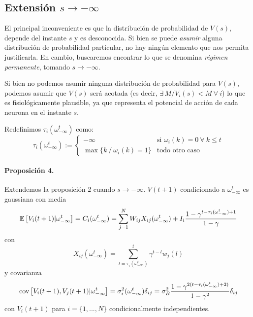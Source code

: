 \subsection{Extensión $s \rightarrow -\infty$} %

El principal inconveniente es que la distribución de probabilidad de $V(s)$, depende del instante $s$ y es desconocida. 
Si bien se puede \emph{asumir} alguna distribución de probabilidad particular, no hay ningún elemento que nos permita justificarla. En cambio, buscaremos encontrar lo que se denomina \emph{régimen permanente}, tomando $s \rightarrow - \infty$.

Si bien no podemos asumir ninguna distribución de probabilidad para $V(s)$, podemos asumir que $V(s)$ será acotada (es decir, $\exists \, M / V_i(s) < M \ \forall \ i$) lo que es fisiológicamente plausible, ya que representa el potencial de acción de cada neurona en el instante $s$.

Redefinimos $\tau_i(\omega_{-\infty}^t)$ como:
\begin{equation}
    \tau_i\left(\omega_{-\infty}^t \right) := \left\{ 
      \begin{array}{cl}
        - \infty & \text{si } \omega_i(k)=0 \ \forall \ k \leq t \\
        \max\{ k \ / \ \omega_i(k)=1 \} & \text{todo otro caso}
      \end{array}
    \right.
\end{equation}

\paragraph{Proposición 4.}
Extendemos la proposición 2 cuando $s \rightarrow-\infty$. $V(t+1)$ condicionado a $\omega_{-\infty}^t$ es gaussiana con media
\begin{equation}
    \mathbb{E} \left[V_i(t+1) | \omega_{-\infty}^t\right] = C_i(\omega_{-\infty}^t) =
    \sum_{j=1}^N W_{ij} X_{ij}(\omega_{-\infty}^t) + I_i \frac{1-\gamma^{t-\tau_i(\omega_{-\infty}^t)+1}}{1-\gamma}
\end{equation}
con
\begin{equation}
    X_{ij}(\omega_{-\infty}^t) = 
    \sum_{l=\tau_i(\omega_{-\infty}^t)}^t \gamma^{t-l} w_j(l)
\end{equation}
y covarianza
\begin{equation}
    \text{cov}\left[V_i(t+1),V_j(t+1) | \omega_{-\infty}^t\right] = \sigma_i^2(\omega_{-\infty}^t) \delta_{ij} = \sigma_B^2 \frac{1-\gamma^{2(t-\tau_i(\omega_{-\infty}^t)+2)}}{1-\gamma^2} \delta_{ij}
\end{equation}
con $V_i(t+1)$ para $i=\{1,...,N\}$ condicionalmente independientes.

